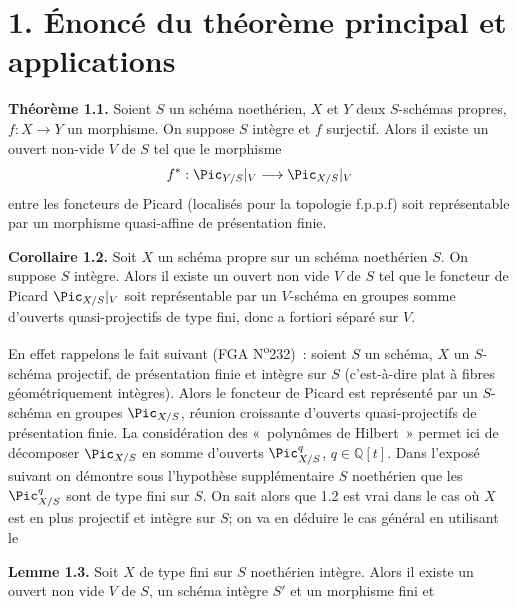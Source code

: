 \section*{1. Énoncé du théorème principal et applications}

\textbf{Théorème 1.1.} Soient \(S\) un schéma noethérien, \(X\) et \(Y\) deux \(S\)-schémas propres, \(f:X\to Y\) un morphisme. On suppose \(S\) intègre et \(f\) surjectif. Alors il existe un ouvert non-vide \(V\) de \(S\) tel que le morphisme
\[
  f^*:\Pic_{Y/S}|_V\longrightarrow \Pic_{X/S}|_V
\]
entre les foncteurs de Picard (localisés pour la topologie f.p.p.f) soit représentable par un morphisme quasi-affine de présentation finie.

\textbf{Corollaire 1.2.} Soit \(X\) un schéma propre sur un schéma noethérien \(S\). On suppose \(S\) intègre. Alors il existe un ouvert non vide \(V\) de \(S\) tel que le foncteur de Picard \(\Pic_{X/S}|_V\) soit représentable par un \(V\)-schéma en groupes somme d'ouverts quasi-projectifs de type fini, donc a fortiori séparé sur \(V\).

En effet rappelons le fait suivant (FGA N\textsuperscript{o}232)~: soient \(S\) un schéma, \(X\) un \(S\)-schéma projectif, de présentation finie et intègre sur \(S\) (c'est-à-dire plat à fibres géométriquement intègres). Alors le foncteur de Picard est représenté par un \(S\)-schéma en groupes \(\Pic_{X/S}\), réunion croissante d'ouverts quasi-projectifs de présentation finie. La considération des «~polynômes de Hilbert~» permet ici de décomposer \(\Pic_{X/S}\) en somme d'ouverts \(\Pic^q_{X/S}\), \(q\in\mathbb Q[t]\). Dans l'exposé suivant on démontre sous l'hypothèse supplémentaire \(S\) noethérien que les \(\Pic^q_{X/S}\) sont de type fini sur \(S\). On sait alors que 1.2 est vrai dans le cas où \(X\) est en plus projectif et intègre sur \(S\); on va en déduire le cas général en utilisant le

\textbf{Lemme 1.3.} Soit \(X\) de type fini sur \(S\) noethérien intègre. Alors il existe un ouvert non vide \(V\) de \(S\), un schéma intègre \(S'\) et un morphisme fini et

